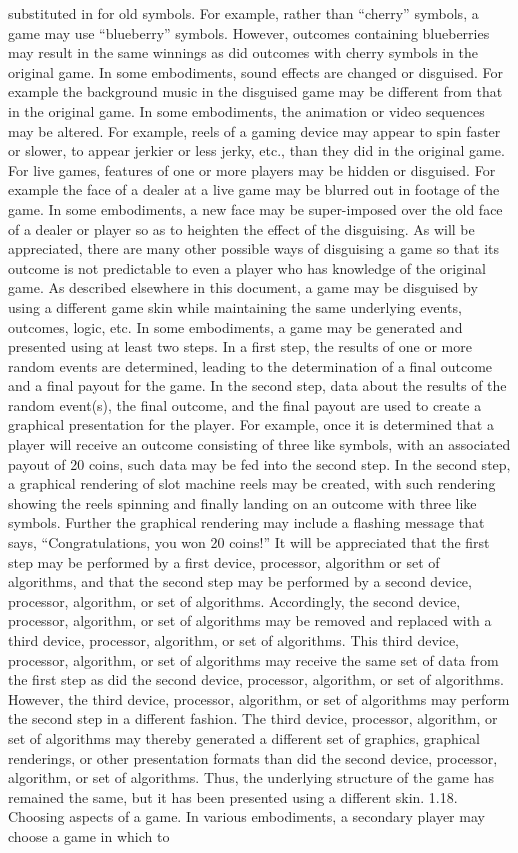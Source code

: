 \documentclass[11pt,a4paper]{article}
\begin{document}
substituted in for old symbols. For example, rather than “cherry” symbols, a game may use “blueberry” symbols. However, outcomes containing blueberries may result in the same winnings as did outcomes with cherry symbols in the original game. In some embodiments, sound effects are changed or disguised. For example the background music in the disguised game may be different from that in the original game. In some embodiments, the animation or video sequences may be altered. For example, reels of a gaming device may appear to spin faster or slower, to appear jerkier or less jerky, etc., than they did in the original game. For live games, features of one or more players may be hidden or disguised. For example the face of a dealer at a live game may be blurred out in footage of the game. In some embodiments, a new face may be super-imposed over the old face of a dealer or player so as to heighten the effect of the disguising. As will be appreciated, there are many other possible ways of disguising a game so that its outcome is not predictable to even a player who has knowledge of the original game. As described elsewhere in this document, a game may be disguised by using a different game skin while maintaining the same underlying events, outcomes, logic, etc. In some embodiments, a game may be generated and presented using at least two steps. In a first step, the results of one or more random events are determined, leading to the determination of a final outcome and a final payout for the game. In the second step, data about the results of the random event(s), the final outcome, and the final payout are used to create a graphical presentation for the player. For example, once it is determined that a player will receive an outcome consisting of three like symbols, with an associated payout of 20 coins, such data may be fed into the second step. In the second step, a graphical rendering of slot machine reels may be created, with such rendering showing the reels spinning and finally landing on an outcome with three like symbols. Further the graphical rendering may include a flashing message that says, “Congratulations, you won 20 coins!” It will be appreciated that the first step may be performed by a first device, processor, algorithm or set of algorithms, and that the second step may be performed by a second device, processor, algorithm, or set of algorithms. Accordingly, the second device, processor, algorithm, or set of algorithms may be removed and replaced with a third device, processor, algorithm, or set of algorithms. This third device, processor, algorithm, or set of algorithms may receive the same set of data from the first step as did the second device, processor, algorithm, or set of algorithms. However, the third device, processor, algorithm, or set of algorithms may perform the second step in a different fashion. The third device, processor, algorithm, or set of algorithms may thereby generated a different set of graphics, graphical renderings, or other presentation formats than did the second device, processor, algorithm, or set of algorithms. Thus, the underlying structure of the game has remained the same, but it has been presented using a different skin. 1.18. Choosing aspects of a game. In various embodiments, a secondary player may choose a game in which to 
\end{document}
